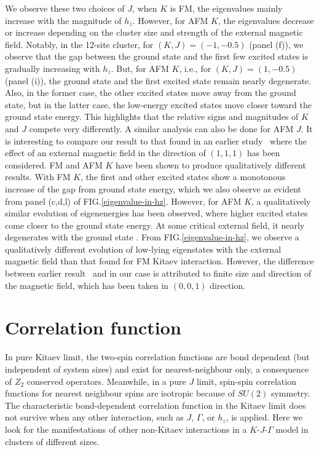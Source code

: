 \documentclass[aps,amsmath,twocolumn,amssymb,floatfix,showpacs,superscriptaddress,nofootinbib,longbibliography]{revtex4-1}
\begin{document}
We observe these two choices of
$J$, when $K$ is FM, the eigenvalues mainly increase with the magnitude of $h_z$. However, for AFM $K$, the eigenvalues decrease or increase depending on the cluster size and strength of the external magnetic field. Notably, in the 12-site cluster, for $(K, J)=(-1,-0.5)$ (panel (f)), we observe that the gap between the ground state and the first few excited states is gradually increasing with $h_z$. But, for AFM $K$,
i.e., for $(K, J)=(1,-0.5)$ (panel (i)), the ground state and the first excited state remain nearly degenerate. Also, in the former case, the other excited states move away from the ground state, but in the latter case, the low-energy excited states move closer toward the ground state energy. This highlights that the relative signs and magnitudes of $K$ and $J$ compete very differently. A similar analysis can also be done for AFM $J$. It is interesting to compare our result to that found in an earlier study~\cite{zhu-2018} where the effect of an external magnetic field in the direction of $\left(1,1,1\right)$ has been considered. FM and AFM $K$ have been shown to produce qualitatively different results. With FM $K$, the first and other excited states show a monotonous increase of the gap from ground state energy, which we also observe as evident from panel (c,d,l) of FIG.\ref{eigenvalue-in-hz}. However, for AFM $K$, a qualitatively similar evolution of eigenenergies has been observed, where higher excited states come closer to the ground state energy. At some critical external field, it nearly degenerates with the ground state \cite{zhu-2018}. From FIG.\ref{eigenvalue-in-hz}, we observe a qualitatively different evolution of low-lying eigenstates with the external magnetic field than that found for FM Kitaev interaction. However, the difference between earlier result~\cite{zhu-2018} and in our case is attributed to finite size\cite{holzmann-2016} and direction of the magnetic field, which has been taken in $\left(0,0,1\right)$ direction.
\section{Correlation function}\label{correlation}
In pure Kitaev limit, the two-spin correlation functions are bond dependent (but independent of system sizes) and exist for nearest-neighbour only, a consequence of $Z_2$ conserved operators. Meanwhile, in a pure $J$ limit, spin-spin correlation functions for nearest neighbour spins are isotropic because of $SU(2)$ symmetry. The characteristic bond-dependent correlation function in the Kitaev limit does not survive when any other interaction, such as $J$, $\Gamma$, or $h_z$, is applied. Here we look for the manifestations of other non-Kitaev interactions in a $K$-$J$-$\Gamma$ model\cite{khwang-2022,feng-2022,han-li-2023,yilmaz-2022,shuyi-2023,smit-2020,kimchi-2014,yamaji-2016,young-baek-kim-2015,wang-2021} in clusters of different sizes.
\end{document}
